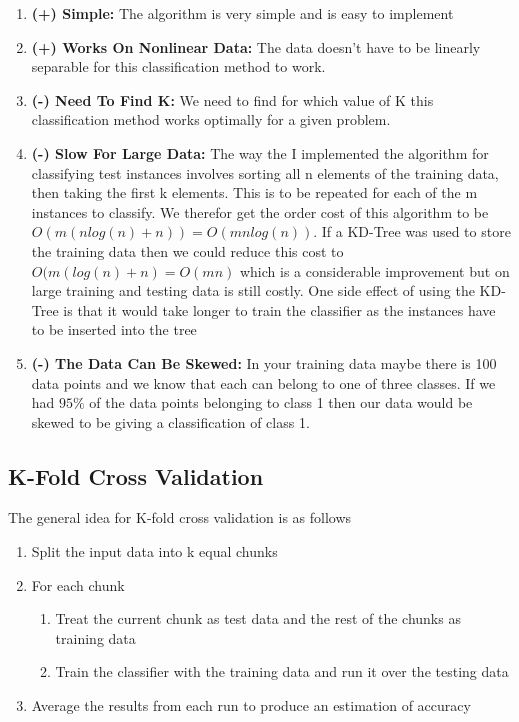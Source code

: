 \documentclass[a4paper, 12pt]{article}
\begin{document}
  		
  			\begin{enumerate}
				  			
				\item \textbf{(+) Simple:} The algorithm is very simple and is easy to implement				  			
				  			
				\item \textbf{(+) Works On Nonlinear Data:} The data doesn't have to be linearly separable for this classification method to work.		  			
				  			
  				\item \textbf{(-) Need To Find K:} We need to find for which value of K this classification method works optimally for a given problem.
  			
  				\item \textbf{(-) Slow For Large Data:} The way the I implemented the algorithm for classifying test instances involves sorting all n elements of the training data, then taking the first k elements. This is to be repeated for each of the m instances to classify. We therefor get the order cost of this algorithm to be $O(m(nlog(n) + n)) = O(mnlog(n))$. If a KD-Tree was used to store the training data then we could reduce this cost to $O(m(log(n) + n) = O(mn)$ which is a considerable improvement but on large training and testing data is still costly. One side effect of using the KD-Tree is that it would take longer to train the classifier as the instances have to be inserted into the tree
  				
  				\item \textbf{(-) The Data Can Be Skewed:} In your training data maybe there is 100 data points and we know that each can belong to one of three classes. If we had $95\%$ of the data points belonging to class 1 then our data would be skewed to be giving a classification of class 1.
  			
  			\end{enumerate}
  			
  		\subsection{K-Fold Cross Validation}
  			The general idea for K-fold cross validation is as follows
  			
  			\begin{enumerate}
  				\item Split the input data into k equal chunks
  				\item For each chunk
  				\begin{enumerate}
  					\item Treat the current chunk as test data and the rest of the chunks as training data
  					\item Train the classifier with the training data and run it over the testing data
  				\end{enumerate}
  				\item Average the results from each run to produce an estimation of accuracy
  			\end{enumerate}
  			
\end{document}
